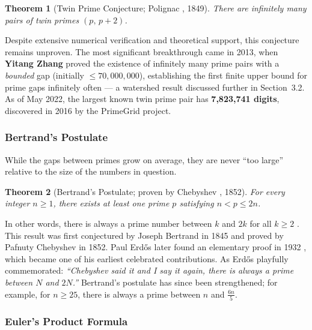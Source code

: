 \documentclass[11pt]{article}
\theoremstyle{plain}
\newtheorem{theorem}{Theorem}
\theoremstyle{definition}
\theoremstyle{remark}
\begin{document}
\begin{theorem}[Twin Prime Conjecture; Polignac \cite{polignac_1849}, 1849]
	\label{thm:twinthm}
	There are infinitely many pairs of twin primes $(p,\, p + 2)$.
\end{theorem}

\par Despite extensive numerical verification and theoretical support, this conjecture remains unproven. The most significant breakthrough came in 2013, when \textbf{Yitang Zhang} proved the existence of infinitely many prime pairs with a \textit{bounded} gap (initially $\leq 70{,}000{,}000$), establishing the first finite upper bound for prime gaps infinitely often — a watershed result discussed further in Section~3.2. As of May 2022, the largest known twin prime pair has \textbf{7,823,741 digits}, discovered in 2016 by the PrimeGrid project.

\subsubsection{Bertrand's Postulate}

\par While the gaps between primes grow on average, they are never ``too large'' relative to the size of the numbers in question.

\begin{theorem}[Bertrand's Postulate; proven by Chebyshev \cite{chebyshev_bertrand_1852}, 1852]
	For every integer $n \geq 1$, there exists at least one prime $p$ satisfying $n < p \leq 2n$.
\end{theorem}

\par In other words, there is always a prime number between $k$ and $2k$ for all $k \geq 2$ \cite{utm_bertrand}. This result was first conjectured by Joseph Bertrand in 1845 and proved by Pafnuty Chebyshev in 1852. Paul Erd\H{o}s later found an elementary proof in 1932 \cite{erdos_bertrand_1932}, which became one of his earliest celebrated contributions. As Erd\H{o}s playfully commemorated: \textit{``Chebyshev said it and I say it again, there is always a prime between $N$ and $2N$.''} Bertrand's postulate has since been strengthened; for example, for $n \geq 25$, there is always a prime between $n$ and $\frac{6n}{5}$.

\subsubsection{Euler's Product Formula}
\end{document}
